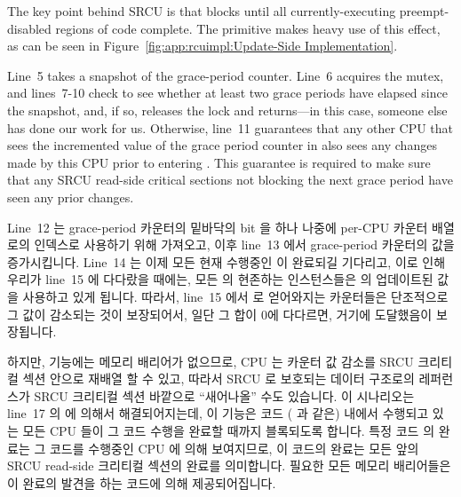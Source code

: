 The key point behind SRCU is that 
blocks until all currently-executing preempt-disabled regions of
code complete.
The  primitive makes heavy use of this effect,
as can be seen in
Figure~\ref{fig:app:rcuimpl:Update-Side Implementation}.

Line~5 takes a snapshot of the grace-period counter.
Line~6 acquires the mutex, and lines~7-10 check to see whether
at least two grace periods have elapsed since the snapshot,
and, if so, releases the lock and returns---in this case, someone
else has done our work for us.
Otherwise, line~11 guarantees that any other CPU that sees the
incremented value of the grace period counter in 
also sees any changes made by this CPU prior to entering
.
This guarantee is required to make sure that any SRCU read-side
critical sections not blocking the next grace period have seen
any prior changes.
\fi

Line~12 는 grace-period 카운터의 밑바닥의 bit 을 하나 나중에 per-CPU 카운터
배열로의 인덱스로 사용하기 위해 가져오고, 이후 line~13 에서 grace-period
카운터의 값을 증가시킵니다.
Line~14 는 이제 모든 현재 수행중인  이 완료되길 기다리고,
이로 인해 우리가 line~15 에 다다랐을 때에는, 모든  의
현존하는 인스턴스들은  의 업데이트된 값을 사용하고 있게
됩니다.
따라서, line~15 에서  로 얻어와지는 카운터들은
단조적으로 그 값이 감소되는 것이 보장되어서, 일단 그 합이 0에 다다르면, 거기에
도달했음이 보장됩니다.

하지만,  기능에는 메모리 배리어가 없으므로, CPU 는
카운터 값 감소를 SRCU 크리티컬 섹션 안으로 재배열 할 수 있고, 따라서 SRCU 로
보호되는 데이터 구조로의 레퍼런스가 SRCU 크리티컬 섹션 바깥으로 ``새어나올''
수도 있습니다.
이 시나리오는 line~17 의  에 의해서 해결되어지는데, 이
기능은  코드 ( 과 같은) 내에서
수행되고 있는 모든 CPU 들이 그 코드 수행을 완료할 때까지 블록되도록 합니다.
특정  코드 의 완료는 그 코드를 수행중인 CPU 에 의해
보여지므로, 이 코드의 완료는 모든 앞의 SRCU read-side 크리티컬 섹션의 완료를
의미합니다.
필요한 모든 메모리 배리어들은 이 완료의 발견을 하는 코드에 의해 제공되어집니다.

